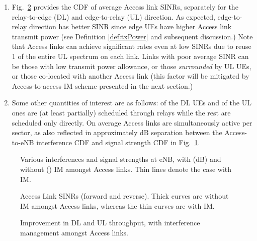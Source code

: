 \documentclass[journal]{IEEEtran}
\begin{document}
\begin{enumerate}
  \item Fig.~\ref{fig:acc} provides the CDF of average Access link SINRs, separately for the relay-to-edge (DL) and edge-to-relay (UL) direction.  As expected, edge-to-relay direction has better SINR since edge UEs have higher Access link transmit power (see Definition \ref{def:txPower} and subsequent discussion.) Note that Access links can achieve significant rates even at low SINRs due to reuse 1 of the entire UL spectrum on each link.  Links with poor average SINR can be those with low transmit power allowance, or those {\em surrounded} by UL UEs, or those co-located with another Access link (this factor will be mitigated by Access-to-access IM scheme presented in the next section.)
  \item Some other quantities of interest are as follows:  of the DL UEs and  of the UL ones are (at least partially) scheduled through relays while the rest are scheduled only directly.  On average  Access links are simultaneously active per sector, as also reflected in approximately dB separation between the Access-to-eNB interference CDF and signal strength CDF in Fig.~\ref{fig:intf}.
\end{enumerate}

\begin{figure}
\centering
{}
\caption{Various interferences and signal strengths at eNB, with (dB) and without () IM amongst Access links. Thin lines denote the case with IM.}
\label{fig:intf}
\end{figure}
\begin{figure}
\centering
{}
\caption{Access Link SINRs (forward and reverse). Thick curves are without IM amongst Access links, whereas the thin curves are with IM.}
\label{fig:acc}
\vspace{-0.2in}
\end{figure}
\begin{figure}
\centering
{}
\caption{Improvement in DL and UL throughput, with interference management amongst Access links.}
\vspace{-0.2in}
\label{fig:gainIM}
\end{figure}
\end{document}
